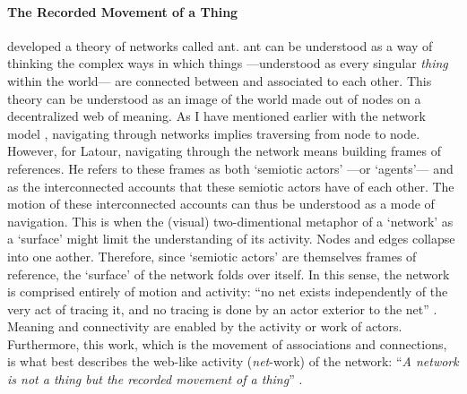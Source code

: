 \paragraph{The Recorded Movement of a Thing}
\textcite{Lat90:On, Lat93:We} developed a theory of networks called \gls{ant}. \gls{ant} can be understood as a way of thinking the complex ways in which things ---understood as every singular \textit{thing} within the world--- are connected between and associated to each other. This theory can be understood as an image of the world made out of nodes on a decentralized web of meaning. As I have mentioned earlier with the network model , navigating through networks implies traversing from node to node. However, for Latour, navigating through the network means building frames of references. He refers to these frames as both `semiotic actors' ---or `agents'--- and as the interconnected accounts that these semiotic actors have of each other. The motion of these interconnected accounts can thus be understood as a mode of navigation. This is when the (visual) two-dimentional metaphor of a `network' as a `surface' might limit the understanding of its activity. Nodes and edges collapse into one aother. Therefore, since `semiotic actors' are themselves frames of reference, the `surface' of the network folds over itself. In this sense, the network is comprised entirely of motion and activity: ``no net exists independently of the very act of tracing it, and no tracing is done by an actor exterior to the net'' \parencite[14]{Lat90:On}. Meaning and connectivity are enabled by the activity or work of actors. Furthermore, this work, which is the movement of associations and connections, is what best describes the web-like activity (\textit{net}-work) of the network: ``\textit{A network is not a thing but the recorded movement of a thing}'' \im \parencite[14]{Lat90:On}.
 
